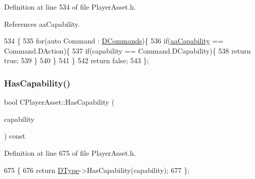 Definition at line 534 of file Player\+Asset.\+h.



References aa\+Capability.


\begin{DoxyCode}
534                                                                        \{
535             \textcolor{keywordflow}{for}(\textcolor{keyword}{auto} Command : \hyperlink{classCPlayerAsset_a4d3b96106d3b1c1020f98005884d2a87}{DCommands})\{
536                 \textcolor{keywordflow}{if}(\hyperlink{GameDataTypes_8h_ab47668e651a3032cfb9c40ea2d60d670acf9fb164e8abd71c71f4a8c7fda360d4}{aaCapability} == Command.DAction)\{
537                     \textcolor{keywordflow}{if}(capability == Command.DCapability)\{
538                         \textcolor{keywordflow}{return} \textcolor{keyword}{true};
539                     \}
540                 \}
541             \}
542             \textcolor{keywordflow}{return} \textcolor{keyword}{false};
543         \};
\end{DoxyCode}
\hypertarget{classCPlayerAsset_ac01bc82d9b4cc54a72cb092fa1368663}{}\label{classCPlayerAsset_ac01bc82d9b4cc54a72cb092fa1368663} 
\subsubsection{\texorpdfstring{Has\+Capability()}{HasCapability()}}
{\footnotesize\ttfamily bool C\+Player\+Asset\+::\+Has\+Capability (\begin{DoxyParamCaption}\item[{\hyperlink{GameDataTypes_8h_a35b98ce26aca678b03c6f9f76e4778ce}{E\+Asset\+Capability\+Type}}]{capability }\end{DoxyParamCaption}) const\hspace{0.3cm}{\ttfamily [inline]}}



Definition at line 675 of file Player\+Asset.\+h.


\begin{DoxyCode}
675                                                                  \{
676             \textcolor{keywordflow}{return} \hyperlink{classCPlayerAsset_a5d61f73471e1e6f0a6ab15f2ffa7b359}{DType}->HasCapability(capability);  
677         \};
\end{DoxyCode}
\hypertarget{classCPlayerAsset_a605862c6f6e57a2c6e21030d716485bd}{}\label{classCPlayerAsset_a605862c6f6e57a2c6e21030d716485bd} 
